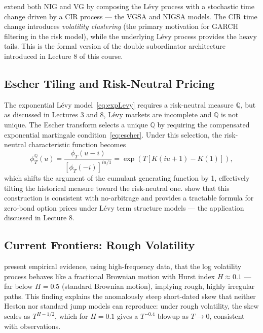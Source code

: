 \documentclass[12pt, a4paper]{article}
\begin{document}
\citet{carr2003sv} extend both NIG and VG by composing the L\'{e}vy
process with a stochastic time change driven by a CIR process --- the
VGSA and NIGSA models. The CIR time change introduces
\emph{volatility clustering} (the primary motivation for GARCH
filtering in the risk model), while the underlying L\'{e}vy process
provides the heavy tails. This is the formal version of the double
subordinator architecture introduced in Lecture 8 of this course.

\subsection{Escher Tiling and Risk-Neutral Pricing}

The exponential L\'{e}vy model~\eqref{eq:expLevy} requires a
risk-neutral measure $\mathbb{Q}$, but as discussed in Lectures 3 and 8,
L\'{e}vy markets are incomplete and $\mathbb{Q}$ is not unique. The
Escher transform \citep{escher1932, eberlein1999} selects a unique
$\mathbb{Q}$ by requiring the compensated exponential martingale
condition~\eqref{eq:escher}. Under this selection, the
risk-neutral characteristic function becomes
\begin{equation}
  \phi_T^{\mathbb{Q}}(u) =
  \frac{\phi_T(u - i)}{[\phi_T(-i)]^{iu/1}}
  = \exp\!\left(T\left[K(iu+1) - K(1)\right]\right),
  \label{eq:escher_q}
\end{equation}
which shifts the argument of the cumulant generating function by 1,
effectively tilting the historical measure toward the risk-neutral one.
\citet{eberlein1999} show that this construction is consistent with
no-arbitrage and provides a tractable formula for zero-bond option
prices under L\'{e}vy term structure models --- the application
discussed in Lecture 8.

\subsection{Current Frontiers: Rough Volatility}

\citet{roughvol2018} present empirical evidence, using high-frequency
data, that the log volatility process behaves like a fractional Brownian
motion with Hurst index $H \approx 0.1$ --- far below $H = 0.5$ (standard
Brownian motion), implying rough, highly irregular paths. This finding
explains the anomalously steep short-dated skew that neither Heston nor
standard jump models can reproduce: under rough volatility,
the skew scales as $T^{H-1/2}$, which for $H = 0.1$ gives a
$T^{-0.4}$ blowup as $T \to 0$, consistent with observations.
\end{document}
